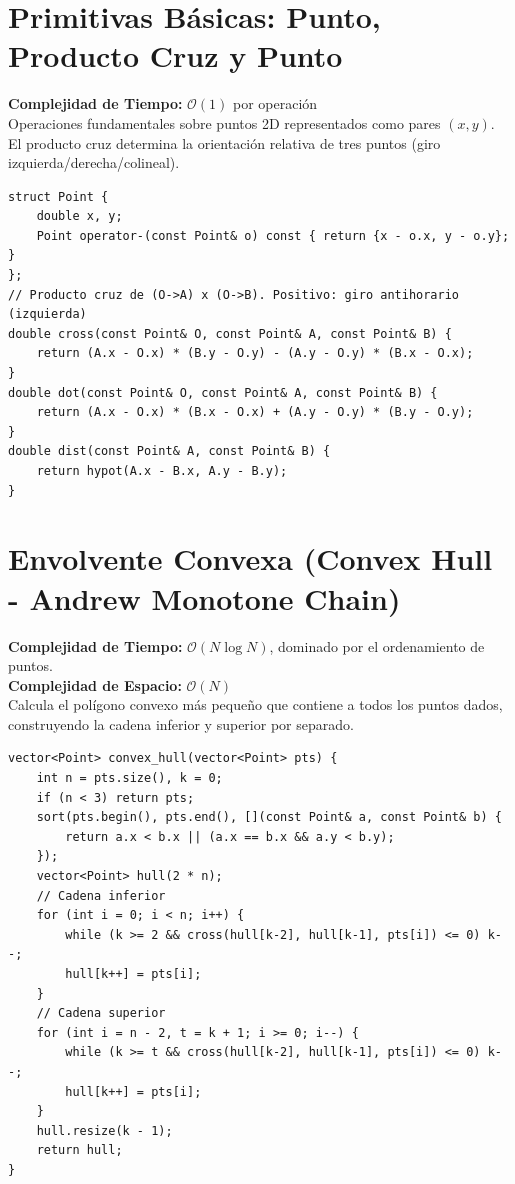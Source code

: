 \documentclass[10pt,twocolumn,letterpaper]{report}
\begin{document}
\section{Primitivas Básicas: Punto, Producto Cruz y Punto}
\textbf{Complejidad de Tiempo:} $\mathcal{O}(1)$ por operación \\
Operaciones fundamentales sobre puntos 2D representados como pares $(x, y)$. El producto cruz determina la orientación relativa de tres puntos (giro izquierda/derecha/colineal).
\begin{lstlisting}
struct Point {
    double x, y;
    Point operator-(const Point& o) const { return {x - o.x, y - o.y}; }
};
// Producto cruz de (O->A) x (O->B). Positivo: giro antihorario (izquierda)
double cross(const Point& O, const Point& A, const Point& B) {
    return (A.x - O.x) * (B.y - O.y) - (A.y - O.y) * (B.x - O.x);
}
double dot(const Point& O, const Point& A, const Point& B) {
    return (A.x - O.x) * (B.x - O.x) + (A.y - O.y) * (B.y - O.y);
}
double dist(const Point& A, const Point& B) {
    return hypot(A.x - B.x, A.y - B.y);
}
\end{lstlisting}
\section{Envolvente Convexa (Convex Hull - Andrew Monotone Chain)}
\textbf{Complejidad de Tiempo:} $\mathcal{O}(N \log N)$, dominado por el ordenamiento de puntos. \\
\textbf{Complejidad de Espacio:} $\mathcal{O}(N)$ \\
Calcula el polígono convexo más pequeño que contiene a todos los puntos dados, construyendo la cadena inferior y superior por separado.
\begin{lstlisting}
vector<Point> convex_hull(vector<Point> pts) {
    int n = pts.size(), k = 0;
    if (n < 3) return pts;
    sort(pts.begin(), pts.end(), [](const Point& a, const Point& b) {
        return a.x < b.x || (a.x == b.x && a.y < b.y);
    });
    vector<Point> hull(2 * n);
    // Cadena inferior
    for (int i = 0; i < n; i++) {
        while (k >= 2 && cross(hull[k-2], hull[k-1], pts[i]) <= 0) k--;
        hull[k++] = pts[i];
    }
    // Cadena superior
    for (int i = n - 2, t = k + 1; i >= 0; i--) {
        while (k >= t && cross(hull[k-2], hull[k-1], pts[i]) <= 0) k--;
        hull[k++] = pts[i];
    }
    hull.resize(k - 1);
    return hull;
}
\end{lstlisting}
\end{document}
